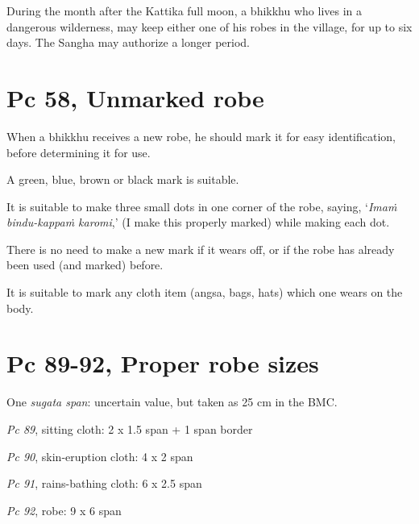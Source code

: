 During the month after the Kattika full moon, a bhikkhu who lives in a
dangerous wilderness, may keep either one of his robes in the village,
for up to six days. The Sangha may authorize a longer period.

\section{Pc 58, Unmarked robe}

When a bhikkhu receives a new robe, he should mark it for easy
identification, before determining it for use.

A green, blue, brown or black mark is suitable.

It is suitable to make three small dots in one corner of the robe,
saying, `\emph{Imaṁ bindu-kappaṁ karomi},' (I make this properly marked)
while making each dot.

There is no need to make a new mark if it wears off, or if the robe has
already been used (and marked) before.

It is suitable to mark any cloth item (angsa, bags, hats) which one
wears on the body.

\section{Pc 89-92, Proper robe sizes}

One \emph{sugata span}: uncertain value, but taken as 25 cm in the BMC.

\emph{Pc 89}, sitting cloth: 2 x 1.5 span + 1 span border

\emph{Pc 90}, skin-eruption cloth: 4 x 2 span

\emph{Pc 91}, rains-bathing cloth: 6 x 2.5 span

\emph{Pc 92}, robe: 9 x 6 span

